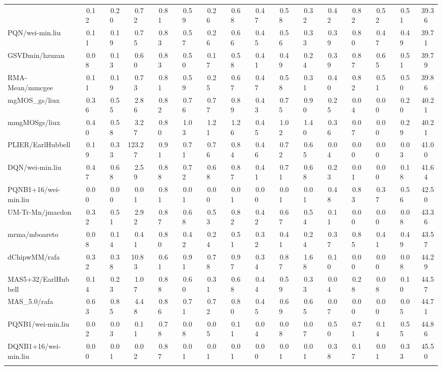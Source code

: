 \begin{table}[hptb]
\begin{center}
\begin{tabular}{|l||c|c|c|c|c|c|c|c|c|c|c|c|c|c|c|}
{RMA-75/mmcgee&~~0.12&~~0.20&~~0.72&~~0.81&~~0.59&~~0.26&~~0.68&~~0.47&~~0.58&~~0.32&~~0.42&~~0.82&~~0.52&~~0.51&~39.36\\ 
PQN/wei-min.liu&~~0.11&~~0.19&~~0.75&~~0.83&~~0.57&~~0.26&~~0.66&~~0.45&~~0.56&~~0.33&~~0.39&~~0.80&~~0.47&~~0.49&~39.71\\ 
GSVDmin/hzuzan&~~0.08&~~0.13&~~0.60&~~0.83&~~0.50&~~0.17&~~0.58&~~0.41&~~0.49&~~0.24&~~0.39&~~0.87&~~0.65&~~0.51&~39.79\\ 
RMA-Mean/mmcgee&~~0.11&~~0.19&~~0.73&~~0.81&~~0.59&~~0.25&~~0.67&~~0.47&~~0.58&~~0.31&~~0.40&~~0.82&~~0.51&~~0.50&~39.86\\ 
mgMOS_gs/liux&~~0.36&~~0.55&~~2.86&~~0.82&~~0.76&~~0.77&~~0.89&~~0.43&~~0.75&~~0.90&~~0.25&~~0.04&~~0.00&~~0.20&~40.21\\ 
mmgMOSgs/liux&~~0.40&~~0.58&~~3.27&~~0.80&~~1.03&~~1.21&~~1.26&~~0.45&~~1.02&~~1.40&~~0.36&~~0.07&~~0.00&~~0.29&~40.21\\ 
PLIER/EarlHubbell&~~0.19&~~0.33&123.27&~~0.91&~~0.71&~~0.76&~~0.84&~~0.46&~~0.72&~~0.65&~~0.04&~~0.00&~~0.00&~~0.03&~41.00\\ 
DQN/wei-min.liu&~~0.47&~~0.68&~~2.59&~~0.88&~~0.72&~~0.68&~~0.87&~~0.41&~~0.71&~~0.68&~~0.23&~~0.01&~~0.00&~~0.18&~41.64\\ 
PQNB1+16/wei-min.liu&~~0.00&~~0.00&~~0.01&~~0.81&~~0.01&~~0.00&~~0.01&~~0.00&~~0.01&~~0.01&~~0.48&~~0.83&~~0.37&~~0.56&~42.50\\ 
UM-Tr-Mn/jmacdon&~~0.32&~~0.51&~~2.92&~~0.87&~~0.68&~~0.53&~~0.82&~~0.42&~~0.67&~~0.54&~~0.11&~~0.00&~~0.00&~~0.08&~43.36\\ 
mrma/mboareto&~~0.08&~~0.14&~~0.41&~~0.80&~~0.42&~~0.24&~~0.51&~~0.32&~~0.41&~~0.24&~~0.37&~~0.85&~~0.41&~~0.49&~43.57\\ 
dChipwMM/rafa&~~0.32&~~0.38&~10.83&~~0.61&~~0.91&~~0.78&~~0.97&~~0.34&~~0.87&~~1.68&~~0.10&~~0.00&~~0.00&~~0.08&~44.29\\ 
MAS5+32/EarlHubbell&~~0.14&~~0.23&~~1.07&~~0.88&~~0.60&~~0.31&~~0.68&~~0.44&~~0.59&~~0.33&~~0.04&~~0.28&~~0.08&~~0.10&~44.57\\ 
MAS_5.0/rafa&~~0.63&~~0.85&~~4.48&~~0.86&~~0.71&~~0.72&~~0.80&~~0.45&~~0.69&~~0.65&~~0.07&~~0.00&~~0.00&~~0.05&~44.71\\ 
PQNB1/wei-min.liu&~~0.02&~~0.03&~~0.11&~~0.78&~~0.08&~~0.05&~~0.11&~~0.04&~~0.08&~~0.07&~~0.50&~~0.71&~~0.14&~~0.55&~44.86\\ 
DQNB1+16/wei-min.liu&~~0.00&~~0.01&~~0.02&~~0.87&~~0.01&~~0.01&~~0.01&~~0.00&~~0.01&~~0.01&~~0.38&~~0.17&~~0.01&~~0.33&~45.50\\ 
}
\end{tabular}
\end{center}
\end{table}
